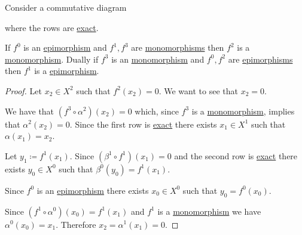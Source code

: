 \documentclass[../../main]{subfiles}
\begin{document}
\begin{lemma}\label{lemma:five-lemma}
  Consider a commutative diagram
  \begin{center}
  \end{center}
  where the rows are \hyperref[def:exact-sequence]{exact}.

  If \(f^{0}\) is an \hyperref[def:mono-epi-morphism]{epimorphism} and \(f^{1}, f^{3}\) are \hyperref[def:mono-epi-morphism]{monomorphisms} then \(f^{2}\) is a \hyperref[def:mono-epi-morphism]{monomorphism}.
  Dually if \(f^{3}\) is an \hyperref[def:mono-epi-morphism]{monomorphism} and \(f^{0}, f^{2}\) are \hyperref[def:mono-epi-morphism]{epimorphisms} then \(f^{1}\) is a \hyperref[def:mono-epi-morphism]{epimorphism}.
\end{lemma}
\begin{proof}
  Let \(x_{2} \in X^{2}\) such that \(f^{2}(x_{2}) = 0\).
  We want to see that \(x_{2} = 0\).
  
  We have that \((f^{3} \circ \alpha^{2})(x_{2}) = 0\) which, since \(f^{3}\) is a \hyperref[def:mono-epi-morphism]{monomorphism}, implies that \(\alpha^{2}(x_{2}) = 0\).
  Since the first row is \hyperref[def:exact-sequence]{exact} there exists \(x_{1} \in X^{1}\) such that \(\alpha(x_{1}) = x_{2}\).

  Let \(y_{1} \coloneq f^{1}(x_{1})\).
  Since \((\beta^{1} \circ f^{1})(x_{1}) = 0\) and the second row is \hyperref[def:exact-sequence]{exact} there exists \(y_{0} \in X^{0}\) such that \(\beta^{0}(y_{0}) = f^{1}(x_{1})\).

  Since \(f^{0}\) is an \hyperref[def:mono-epi-morphism]{epimorphism} there exists \(x_{0} \in X^{0}\) such that \(y_{0} = f^{0}(x_{0})\).
  
  Since \((f^{1} \circ \alpha^{0})(x_{0}) = f^{1}(x_{1})\) and \(f^{1}\) is a \hyperref[def:mono-epi-morphism]{monomorphism} we have \(\alpha^{0}(x_{0}) = x_{1}\).
  Therefore \(x_{2} = \alpha^{1}(x_{1}) = 0\).
\end{proof}
\end{document}
